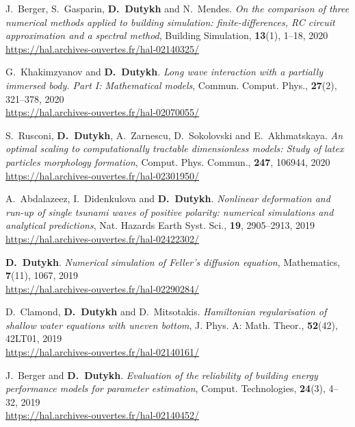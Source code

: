 \begin{etaremune}
  \item J.~Berger, S.~Gasparin, \textbf{D.~Dutykh} and N.~Mendes. \textit{On the comparison of three numerical methods applied to building simulation: finite-differences, RC circuit approximation and a spectral method}, Building Simulation, \textbf{13}(1), 1--18, 2020 \\ %
  \url{https://hal.archives-ouvertes.fr/hal-02140325/}
  
  \item G.~Khakimzyanov and \textbf{D.~Dutykh}. \textit{Long wave interaction with a partially immersed body. Part I: Mathematical models}, Commun. Comput. Phys., \textbf{27}(2), 321--378, 2020 \\ %
  \url{https://hal.archives-ouvertes.fr/hal-02070055/}
  
  \item S.~Rusconi, \textbf{D.~Dutykh}, A.~Zarnescu, D.~Sokolovski and E.~Akhmatskaya. \textit{An optimal scaling to computationally tractable dimensionless models: Study of latex particles morphology formation}, Comput. Phys. Commun., \textbf{247}, 106944, 2020 \\ %
  \url{https://hal.archives-ouvertes.fr/hal-02301950/}
  
  
  \item A.~Abdalazeez, I.~Didenkulova and \textbf{D.~Dutykh}. \textit{Nonlinear deformation and run-up of single tsunami waves of positive polarity: numerical simulations and analytical predictions}, Nat. Hazards Earth Syst. Sci., \textbf{19}, 2905--2913, 2019 \\ %
  \url{https://hal.archives-ouvertes.fr/hal-02422302/}
  
  \item \textbf{D.~Dutykh}. \textit{Numerical simulation of Feller's diffusion equation}, Mathematics, \textbf{7}(11), 1067, 2019 \\ %
  \url{https://hal.archives-ouvertes.fr/hal-02290284/}
  
  \item D.~Clamond, \textbf{D.~Dutykh} and D.~Mitsotakis. \textit{Hamiltonian regularisation of shallow water equations with uneven bottom}, J. Phys. A: Math. Theor., \textbf{52}(42), 42LT01, 2019 \\ %
  \url{https://hal.archives-ouvertes.fr/hal-02140161/}
  
  \item J.~Berger and \textbf{D.~Dutykh}. \textit{Evaluation of the reliability of building energy performance models for parameter estimation}, Comput. Technologies, \textbf{24}(3), 4--32, 2019 \\ %
  \url{https://hal.archives-ouvertes.fr/hal-02140452/}
  

\end{etaremune}
